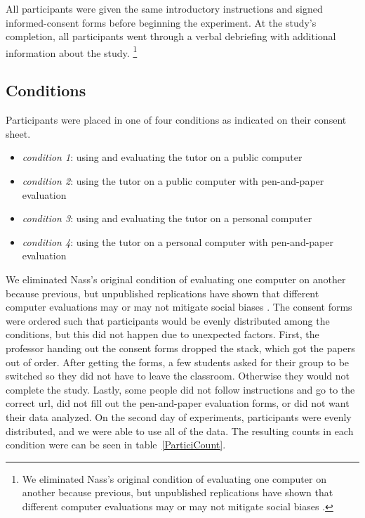 \documentclass{sig-alternate-05-2015}
\begin{document}
 All participants were given the same introductory instructions and signed informed-consent forms before beginning the experiment.  At the study's completion, all participants went through a verbal debriefing with additional information about the study. \footnote{We eliminated Nass's original condition of evaluating one computer on another because previous, but unpublished replications have shown that different computer evaluations may or may not mitigate social biases \cite{gownivaripalli}.}

\subsection{Conditions}
Participants were placed in one of four conditions as indicated on their consent sheet.  

\begin{itemize}
    \item \textit{condition 1}: using and evaluating the tutor on a public computer 
    \item \textit{condition 2}: using the tutor on a public computer with pen-and-paper evaluation
    \item \textit{condition 3}: using and evaluating the tutor on a personal computer
    \item \textit{condition 4}: using the tutor on a personal computer with pen-and-paper evaluation
\end{itemize}
We eliminated Nass's original condition of evaluating one computer on another because previous, but unpublished replications have shown that different computer evaluations may or may not mitigate social biases \cite{gownivaripalli}.  The consent forms were ordered such that participants would be evenly distributed among the conditions, but this did not happen due to unexpected factors.  First, the professor handing out the consent forms dropped the stack, which got the papers out of order.  After getting the forms, a few students asked for their group to be switched so they did not have to leave the classroom.  Otherwise they would not complete the study.  Lastly, some people did not follow instructions and go to the correct url, did not fill out the pen-and-paper evaluation forms, or did not want their data analyzed.   On the second day of experiments, participants were evenly distributed, and we were able to use all of the data.  The resulting counts in each condition were can be seen in table~\ref{ParticiCount}. 


\begin{table}[H]
\caption{Breakdown of participants in each condition by day.}
\label{ParticiCount}
\end{table}
\end{document}
